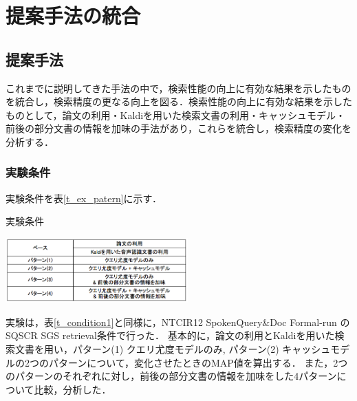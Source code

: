 \chapter{提案手法の統合}

\section{提案手法}

これまでに説明してきた手法の中で，検索性能の向上に有効な結果を示したものを統合し，検索精度の更なる向上を図る．検索性能の向上に有効な結果を示したものとして，論文の利用・Kaldiを用いた検索文書の利用・キャッシュモデル・前後の部分文書の情報を加味の手法があり，これらを統合し，検索精度の変化を分析する．

\subsection{実験条件}
実験条件を表\ref{t_ex_patern}に示す．

\begin{table}[h]
    \centering
    \caption{実験条件}
    \includegraphics[width=7cm]{./image/t_ex_patern.png}
    \label{t_ex_patern}
\end{table}

実験は，表\ref{t_condition1}と同様に，NTCIR12 SpokenQuery\&Doc Formal-run の SQSCR SGS retrieval条件で行った．
基本的に，論文の利用とKaldiを用いた検索文書を用い，パターン(1) クエリ尤度モデルのみ, パターン(2) キャッシュモデルの2つのパターンについて，変化させたときのMAP値を算出する．
また，2つのパターンのそれぞれに対し，前後の部分文書の情報を加味をした4パターンについて比較，分析した．

